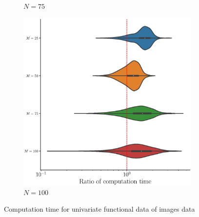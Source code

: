 \begin{results}
\begin{figure}
\begin{subfigure}[b]{0.49\textwidth}
         \caption{$N = 75$}
         \label{fig:computation_time_mfd_2d_75}
     \end{subfigure}
     \begin{subfigure}[b]{0.49\textwidth}
         \centering
         \includegraphics[width=\textwidth]{figures/scenario_2/computation_time_N100.eps}
         \caption{$N = 100$}
         \label{fig:computation_time_mfd_2d_100}
    \end{subfigure}
    \caption{Computation time for univariate functional data of images data}
    \label{fig:computation_time_mfd_2d}
\end{figure}

\end{results}

